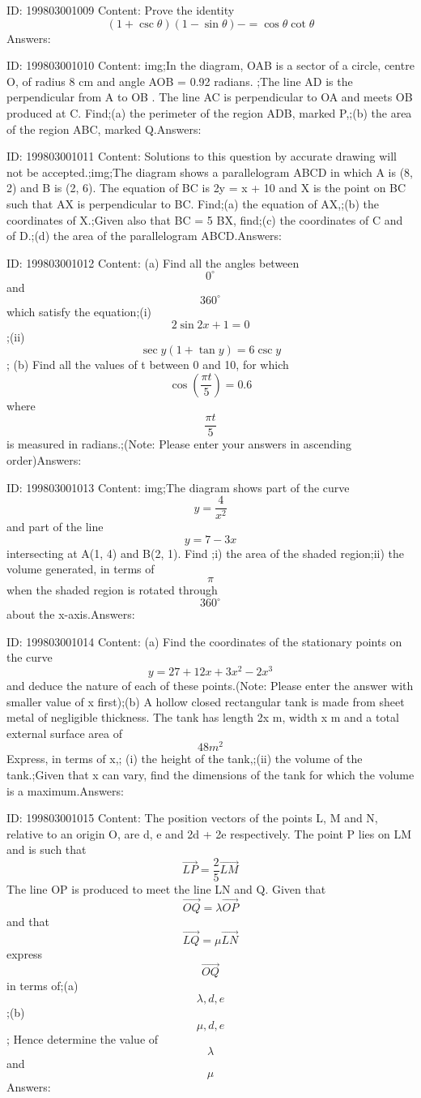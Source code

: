 \documentclass{article}
\begin{document}
ID: 199803001009
Content:
Prove the identity \[(1+\csc \theta)(1-\sin\theta)-=\cos\theta\cot\theta\]Answers:

ID: 199803001010
Content:
img;In the diagram, OAB is a sector of a circle, centre O, of radius 8 cm and angle AOB = 0.92 radians. ;The line AD is the perpendicular from A to OB . The line AC is perpendicular to OA and meets OB produced at C. Find;(a)	the perimeter of the region ADB, marked P,;(b)	the area of the region ABC, marked Q.Answers:

ID: 199803001011
Content:
Solutions to this question by accurate drawing will not be accepted.;img;The diagram shows a parallelogram ABCD in which A is (8, 2) and B is (2, 6). The equation of BC is 2y = x + 10 and X is the point on BC such that AX is perpendicular to BC. Find;(a)	the equation of AX,;(b)	the coordinates of X.;Given also that BC = 5 BX, find;(c)	the coordinates of C and of D.;(d)	the area of the parallelogram ABCD.Answers:

ID: 199803001012
Content:
(a)	Find all the angles between \[0^{\circ}\]  and \[360^{\circ}\]   which satisfy the equation;(i)	\[2 \sin 2x + 1 = 0\];(ii)	\[\sec y(1 + \tan y) = 6 \csc y\]; (b)	Find all the values of t between 0 and 10, for which \[\cos(\frac{\pi t}{5})=0.6\] where \[\frac{\pi t}{5}\]is measured in radians.;(Note: Please enter your answers in ascending order)Answers:

ID: 199803001013
Content:
img;The diagram shows part of the curve \[y=\frac{4}{x^2}\] and part of the line \[y = 7 -3x\] intersecting at A(1, 4) and B(2, 1). Find ;i) the area of the shaded region;ii) the volume generated, in terms of \[\pi\] when the shaded region is rotated through \[360^{\circ}\]   about the x-axis.Answers:

ID: 199803001014
Content:
(a)	Find the coordinates of the stationary points on the curve \[y=27+12x+3x^2-2x^3\] and deduce the nature of each of these points.(Note: Please enter the answer with smaller value of x first);(b)	A hollow closed rectangular tank is made from sheet metal of negligible thickness. The tank has length 2x m, width x m and a total external surface area of \[48m^2\] Express, in terms of x,; (i)	the height of the tank,;(ii)	the volume of the tank.;Given that x can vary, find the dimensions of the tank for which the volume is a maximum.Answers:

ID: 199803001015
Content:
The position vectors of the points L, M and N, relative to an origin O, are d, e and 2d + 2e respectively. The point P lies on LM and is such that \[\vec{LP}=\frac{2}{5}\vec{LM}\] The line OP is produced to meet the line LN and Q. Given that \[\vec{OQ}=\lambda\vec{OP}\] and that \[\vec{LQ}=\mu\vec{LN}\]express \[\vec{OQ}\] in terms of;(a) \[\lambda, d,e\];(b) \[\mu,d,e\]; Hence determine the value of \[\lambda\] and \[\mu\]Answers:
\end{document}
